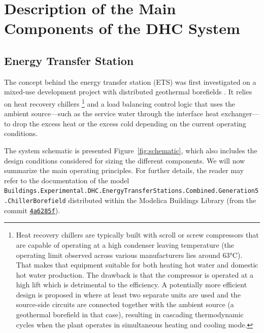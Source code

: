 \section{Description of the Main Components of the DHC System} \label{sec:components}

\subsection{Energy Transfer Station} \label{sec:ets}

The concept behind the energy transfer station (ETS) was first investigated on a mixed-use development project with distributed geothermal borefields \citep{WetterHu2019}.
It relies on heat recovery chillers%
\footnote{Heat recovery chillers are typically built with scroll or screw compressors that are capable of operating at a high condenser leaving temperature (the operating limit observed across various manufacturers lies around 63°C). That makes that equipment suitable for both heating hot water and domestic hot water production. The drawback is that the compressor is operated at a high lift which is detrimental to the efficiency. A potentially more efficient design is proposed in \cite{Cline2020} where at least two separate units are used and the source-side circuits are connected together with the ambient source (a geothermal borefield in that case), resulting in cascading thermodynamic cycles when the plant operates in simultaneous heating and cooling mode.}
and a load balancing control logic that uses the ambient source---such as the service water through the interface heat exchanger---to drop the excess heat or the excess cold depending on the current operating conditions.

The system schematic is presented Figure~\ref{fig:schematic}, which also includes the design conditions considered for sizing the different components.
We will now summarize the main operating principles. For further details, the reader may refer to the documentation of the model \lstinline|Buildings.Experimental.DHC.EnergyTransferStations.Combined.Generation5.ChillerBorefield| distributed within the Modelica Buildings Library (from the commit \href{https://github.com/lbl-srg/modelica-buildings/tree/4a6285f}{\lstinline|4a6285f|}).

